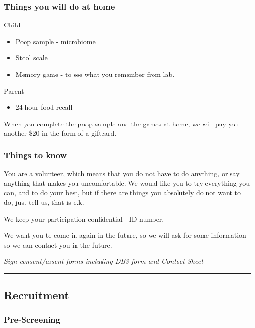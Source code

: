 \documentclass[]{book}
\providecommand{\tightlist}{%
  \setlength{\itemsep}{0pt}\setlength{\parskip}{0pt}}
\begin{document}
\hypertarget{things-you-will-do-at-home}{%
\subsubsection{Things you will do at home}\label{things-you-will-do-at-home}}

Child

\begin{itemize}
\tightlist
\item
  Poop sample - microbiome
\item
  Stool scale
\item
  Memory game - to see what you remember from lab.
\end{itemize}

Parent

\begin{itemize}
\tightlist
\item
  24 hour food recall
\end{itemize}

When you complete the poop sample and the games at home, we will pay you another \$20 in the form of a giftcard.

\hypertarget{things-to-know}{%
\subsubsection{Things to know}\label{things-to-know}}

You are a volunteer, which means that you do not have to do anything, or say anything that makes you uncomfortable. We would like you to try everything you can, and to do your best, but if there are things you absolutely do not want to do, just tell us, that is o.k.

We keep your participation confidential - ID number.

We want you to come in again in the future, so we will ask for some information so we can contact you in the future.

\emph{Sign consent/assent forms including DBS form and Contact Sheet}

\begin{center}\rule{0.5\linewidth}{0.5pt}\end{center}

\hypertarget{recruitment}{%
\subsection{Recruitment}\label{recruitment}}

\hypertarget{pre-screening}{%
\subsubsection{Pre-Screening}\label{pre-screening}}
\end{document}
